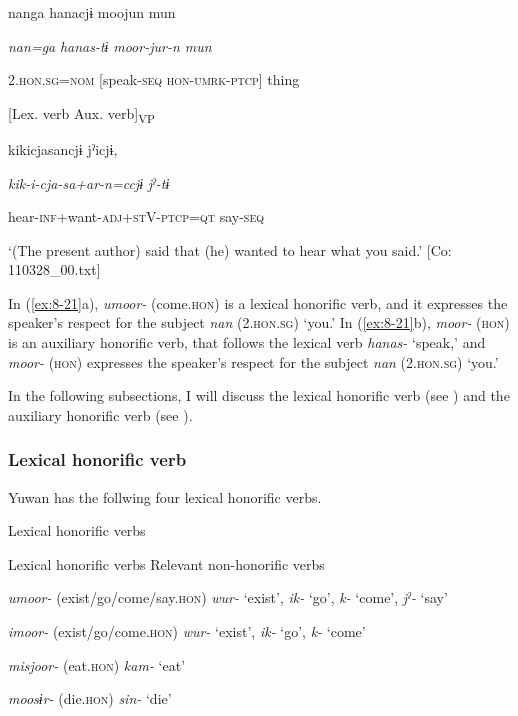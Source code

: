     {\TM}
\glll  nanga  hanacjɨ  moojun  mun

      \textit{nan=ga}  \textit{hanas-tɨ}  \textit{moor{}-jur-n  mun}

      2.\textsc{hon}.\textsc{sg}=\textsc{nom}  [speak-\textsc{seq}  \textsc{hon}-\textsc{umrk}-\textsc{ptcp}]  thing

        [Lex. verb  Aux. verb]\textsubscript{VP}  

      kikicjasancjɨ  jˀicjɨ,

      \textit{kik-i-cja-sa+ar-n=ccjɨ}  \textit{jˀ-tɨ}

      hear-\textsc{inf}+want-\textsc{adj}+\textsc{st}V-\textsc{ptcp}=\textsc{qt}  say-\textsc{seq}

\glt ‘(The present author) said that (he) wanted to hear what you said.’ [Co: 110328\_00.txt]
\z

In (\ref{ex:8-21}a), \textit{umoor-} (come.\textsc{hon}) is a lexical honorific verb, and it expresses the speaker’s respect for the subject \textit{nan} (2.\textsc{hon}.\textsc{sg}) ‘you.’ In (\ref{ex:8-21}b), \textit{moor-} (\textsc{hon}) is an auxiliary honorific verb, that follows the lexical verb \textit{hanas-} ‘speak,’ and \textit{moor-} (\textsc{hon}) expresses the speaker’s respect for the subject \textit{nan} (2.\textsc{hon}.\textsc{sg}) ‘you.’

  In the following subsections, I will discuss the lexical honorific verb (see ) and the auxiliary honorific verb (see ).

\subsubsection{Lexical honorific verb}

Yuwan has the follwing four lexical honorific verbs.

\begin{table}
\caption{\label{tab:key:72}Lexical honorific verbs}

Lexical honorific verbs  Relevant non-honorific verbs

\textit{umoor-} (exist/go/come/say.\textsc{hon})  \textit{wur-} ‘exist’, \textit{ik-} ‘go’, \textit{k-} ‘come’, \textit{jˀ-} ‘say’

\textit{imoor-} (exist/go/come.\textsc{hon})  \textit{wur-} ‘exist’, \textit{ik-} ‘go’, \textit{k-} ‘come’

\textit{misjoor-} (eat.\textsc{hon})  \textit{kam-} ‘eat’

\textit{moosɨr-} (die.\textsc{hon})  \textit{sin-} ‘die’
\end{table}

